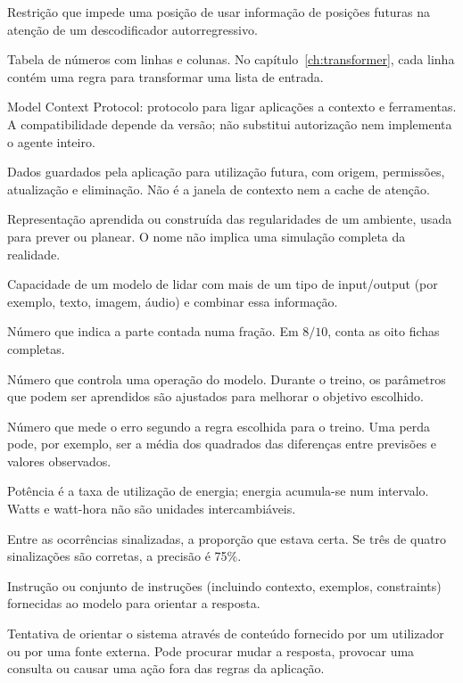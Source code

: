 \begin{description}[style=nextline,leftmargin=0pt,labelindent=0pt,labelsep=0pt,labelwidth=0pt]
\item[Máscara causal] Restrição que impede uma posição de usar informação de posições futuras na atenção de um descodificador autorregressivo.
\item[Matriz] Tabela de números com linhas e colunas. No capítulo~\ref{ch:transformer}, cada linha contém uma regra para transformar uma lista de entrada.
\item[MCP] Model Context Protocol: protocolo para ligar aplicações a contexto e ferramentas. A compatibilidade depende da versão; não substitui autorização nem implementa o agente inteiro.
\item[Memória persistente] Dados guardados pela aplicação para utilização futura, com origem, permissões, atualização e eliminação. Não é a janela de contexto nem a cache de atenção.
\item[Modelo do mundo] Representação aprendida ou construída das regularidades de um ambiente, usada para prever ou planear. O nome não implica uma simulação completa da realidade.
\item[Multimodal] Capacidade de um modelo de lidar com mais de um tipo de input/output (por exemplo, texto, imagem, áudio) e combinar essa informação.
\item[Numerador] Número que indica a parte contada numa fração. Em $8/10$, conta as oito fichas completas.
\item[Parâmetro] Número que controla uma operação do modelo. Durante o treino, os parâmetros que podem ser aprendidos são ajustados para melhorar o objetivo escolhido.
\item[Perda] Número que mede o erro segundo a regra escolhida para o treino. Uma perda pode, por exemplo, ser a média dos quadrados das diferenças entre previsões e valores observados.
\item[Potência e energia] Potência é a taxa de utilização de energia; energia acumula-se num intervalo. Watts e watt-hora não são unidades intercambiáveis.
\item[Precisão] Entre as ocorrências sinalizadas, a proporção que estava certa. Se três de quatro sinalizações são corretas, a precisão é 75\%.
\item[Prompt] Instrução ou conjunto de instruções (incluindo contexto, exemplos, constraints) fornecidas ao modelo para orientar a resposta.
\item[Prompt injection] Tentativa de orientar o sistema através de conteúdo fornecido por um utilizador ou por uma fonte externa. Pode procurar mudar a resposta, provocar uma consulta ou causar uma ação fora das regras da aplicação.

\end{description}
